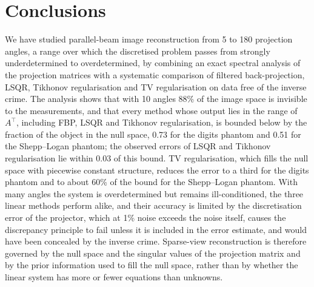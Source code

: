 \documentclass[11pt,a4paper]{article}
\numberwithin{equation}{section}
\theoremstyle{remark}
\newcommand{\T}{\top}
\begin{document}
\section{Conclusions}\label{sec:conclusions}

We have studied parallel-beam image reconstruction from 5 to 180 projection angles, a range over which the discretised problem passes from strongly underdetermined to overdetermined, by combining an exact spectral analysis of the projection matrices with a systematic comparison of filtered back-projection, LSQR, Tikhonov regularisation and TV regularisation on data free of the inverse crime. The analysis shows that with 10 angles 88\% of the image space is invisible to the measurements, and that every method whose output lies in the range of $A^\T$, including FBP, LSQR and Tikhonov regularisation, is bounded below by the fraction of the object in the null space, 0.73 for the digits phantom and 0.51 for the Shepp--Logan phantom; the observed errors of LSQR and Tikhonov regularisation lie within 0.03 of this bound. TV regularisation, which fills the null space with piecewise constant structure, reduces the error to a third for the digits phantom and to about 60\% of the bound for the Shepp--Logan phantom. With many angles the system is overdetermined but remains ill-conditioned, the three linear methods perform alike, and their accuracy is limited by the discretisation error of the projector, which at 1\% noise exceeds the noise itself, causes the discrepancy principle to fail unless it is included in the error estimate, and would have been concealed by the inverse crime. Sparse-view reconstruction is therefore governed by the null space and the singular values of the projection matrix and by the prior information used to fill the null space, rather than by whether the linear system has more or fewer equations than unknowns.
\end{document}
